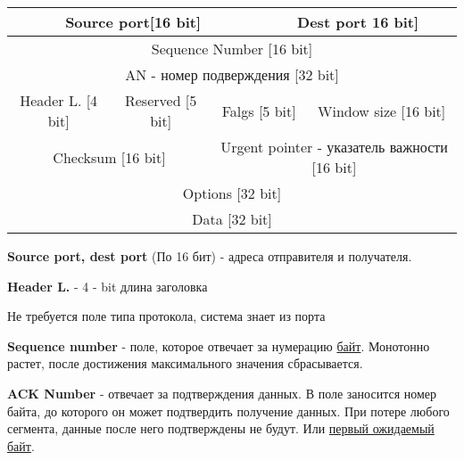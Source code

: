 \documentclass[a4paper,10pt]{article}
\begin{document}
	\begin{table}[h]
		\begin{tabular}{|c|l|clll|c|l|l|c|l|l|l|l|l|}
			\hline
			\multicolumn{8}{|c|}{Source port{[}16 bit{]}}                                                                     & \multicolumn{7}{c|}{Dest port 16 bit{]}}                    \\ \hline
			\multicolumn{15}{|c|}{Sequence Number {[}16 bit{]}}                                                                                                                             \\ \hline
			\multicolumn{15}{|c|}{AN - номер подверждения {[}32 bit{]}}                                                                                                                     \\ \hline
			\multicolumn{2}{|c|}{Header L. {[}4 bit{]}} & \multicolumn{4}{c}{Reserved {[}5 bit{]}} & \multicolumn{3}{c|}{Falgs {[}5 bit{]}} & \multicolumn{6}{c|}{Window size {[}16 bit{]}} \\ \hline
			\multicolumn{6}{|c|}{Checksum {[}16 bit{]}}                                            & \multicolumn{9}{c|}{Urgent pointer - указатель важности {[}16 bit{]}}                  \\ \hline
			\multicolumn{15}{|c|}{Options {[}32 bit{]}}                                                                                                                                     \\ \hline
			\multicolumn{15}{|c|}{Data {[}32 bit{]}}                                                                                                                                        \\ \hline
		\end{tabular}
	\end{table}
	
	
	\textbf{Source port, dest port} (По 16 бит) - адреса отправителя и получателя.
	
	\textbf{Header L.} - 4 - bit длина заголовка
	
	Не требуется поле типа протокола, система знает из порта
	
	\textbf{Sequence number} - поле, которое отвечает за нумерацию \underline{байт}. Монотонно растет, после достижения максимального значения сбрасывается. 
	
	\textbf{ACK Number} - отвечает за подтверждения данных. В поле заносится номер байта, до которого он может подтвердить получение данных. При потере любого сегмента, данные после него подтверждены не будут. Или \underline{первый ожидаемый байт}.
 	
\end{document}

